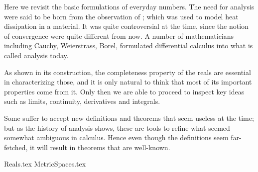  \label{chap:PMA}

Here we revisit the basic formulations of everyday numbers.
The need for analysis were said to be born
from the observation of ;
which was used to model heat dissipation in a material.
It was quite controversial at the time,
since the notion of convergence were quite different from now.
A number of mathematicians including
Cauchy,
Weierstrass,
Borel,
formulated differential calculus into what is called analysis today.

As shown in its construction,
the completeness property of the reals are essential
in characterizing those,
and it is only natural to think that
most of its important properties come from it.
Only then we are able to proceed to inspect key ideas such as
limits,
continuity,
derivatives and integrals.

Some suffer to accept new definitions and theorems
that seem useless at the time;
but as the history of analysis shows,
these are tools to refine what seemed somewhat ambiguous in calculus.
Hence even though the definitions seem far-fetched,
it will result in theorems that are well-known.

{Reals.tex}
{MetricSpaces.tex}